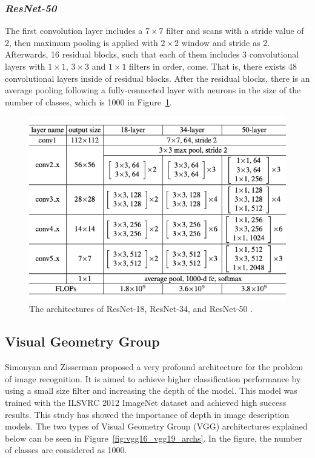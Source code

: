 \subsubsection*{\textit{ResNet-50}}

The first convolution layer includes a $7 \times 7$ filter and scans with a stride value of 2, then maximum pooling is applied with  $2 \times 2 $ window and stride as 2. Afterwards, 16 residual blocks, such that each of them includes 3 convolutional layers with $1 \times 1$, $3 \times 3$ and $1 \times 1$ filters in order, come. That is, there exists 48 convolutional layers inside of residual blocks. After the residual blocks, there is an average pooling following a fully-connected layer with neurons in the size of the number of classes, which is 1000 in Figure~\ref{fig:resnet_archs}.
 
\begin{figure}[h]
    \centering
    \includegraphics[width=\linewidth]{fig/resnet_archs.png}
    \vspace*{1mm}
    \caption{The architectures of ResNet-18, ResNet-34, and ResNet-50 \cite{ResNet}.}
    \label{fig:resnet_archs}
\end{figure}


\subsection{Visual Geometry Group}

Simonyan and Zisserman \cite{VGG} proposed a very profound architecture for the problem of image recognition. It is aimed to achieve higher classification performance by using a small size filter and increasing the depth of the model. This model was trained with the ILSVRC 2012  ImageNet \cite{imagenet} dataset and achieved high success results. This study has showed the importance of depth in image description models. The two types of Visual Geometry Group (VGG) architectures explained below can be seen in Figure~\ref{fig:vgg16_vgg19_archs}. In the figure, the number of classes are considered as 1000.


